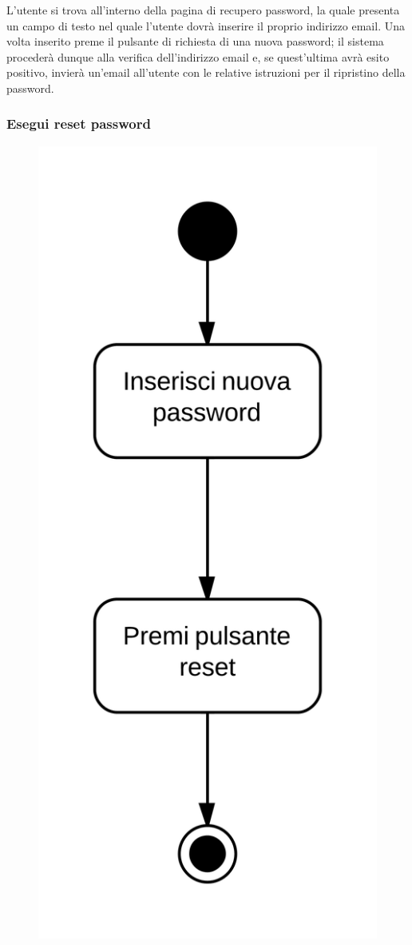 L'utente si trova all'interno della pagina di recupero password, la quale presenta un campo di testo nel quale l'utente dovrà inserire il proprio indirizzo email. Una volta inserito preme il pulsante di richiesta di una nuova password; il sistema  procederà dunque alla verifica dell'indirizzo email e, se quest'ultima avrà esito positivo, invierà un'email all'utente con le relative istruzioni per il ripristino della password.

\subsubsection{Esegui reset password}

\begin{figure}[H]
\centering
\includegraphics[scale=0.05]{uml/attivita/MaaP - Esegui reset password.png}

\end{figure}
